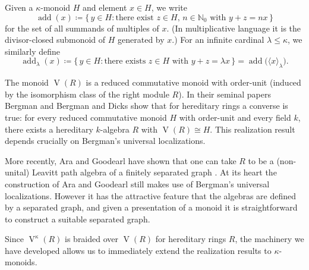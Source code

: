 \documentclass[a4paper,11pt,oneside]{amsart}
\theoremstyle{remark}
\DeclareMathOperator{\add}{add}
\newcommand{\bN}{\mathbb N}
\DeclareMathOperator{\Vmon}{V}
\begin{document}
Given a $\kappa$-monoid $H$ and element $x \in H$, we write
\[
  \add(x) \coloneqq \{\, y \in H : \text{there exist } z \in H,\, n \in \bN_0 \text{ with } y+z=nx \,\}
\]
for the set of all summands of multiples of $x$.
(In multiplicative language it is the divisor-closed submonoid of $H$ generated by $x$.)
For an infinite cardinal $\lambda \le \kappa$, we similarly define
\[
  \add_{\lambda}(x) \coloneqq \{\, y \in H : \text{there exists } z \in H \text{ with } y+z=\lambda x \,\} = \add\big(\langle x \rangle_\lambda\big).
\]

The monoid $\Vmon(R)$ is a reduced commutative monoid with order-unit (induced by the isomorphism class of the right module $R$).
In their seminal papers Bergman \cite{Bergman} and Bergman and Dicks \cite{BergWar} show that for hereditary rings a converse is true: for every reduced commutative monoid $H$ with order-unit and every field $k$, there exists a hereditary $k$-algebra $R$ with $\Vmon(R) \cong H$.
This realization result depends crucially on Bergman's universal localizations.

More recently, Ara and Goodearl have shown that one can take $R$ to be a (non-unital) Leavitt path algebra of a finitely separated graph \cite[Proposition 4.4, Corollary 4.5]{AraGoodearl12}.
At its heart the construction of Ara and Goodearl still makes use of Bergman's universal localizations.
However it has the attractive feature that the algebras are defined by a separated graph, and given a presentation of a monoid it is straightforward to construct a suitable separated graph.

Since $\Vmon^{\kappa}(R)$ is braided over $\Vmon(R)$ for hereditary rings $R$, the machinery we have developed allows us to immediately extend the realization results to $\kappa$-monoids.
\end{document}
